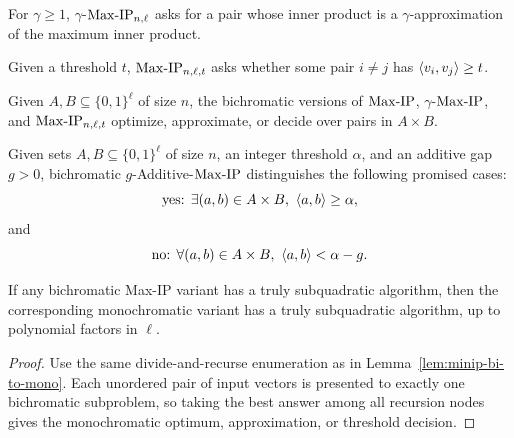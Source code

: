 \begin{definition}
  \label{def:gamma-max-ip}
  For $\gamma\geq 1$, $\gamma$-$\mathrm{Max\mbox{-}IP}_{n,\ell}$ asks for a pair whose inner
  product is a $\gamma$-approximation of the maximum inner product.
\end{definition}

\begin{definition}
  \label{def:max-ip-decision}
  Given a threshold $t$, $\mathrm{Max\mbox{-}IP}_{n,\ell,t}$ asks whether some pair $i\neq j$
  has $\left\langle v_i,v_j\right\rangle\geq t$.
\end{definition}

\begin{definition}
  \label{def:bichromatic-max-ip}
  Given $A,B\subseteq\{0,1\}^{\ell}$ of size $n$, the bichromatic versions of
  $\mathrm{Max\mbox{-}IP}$, $\gamma$-$\mathrm{Max\mbox{-}IP}$, and $\mathrm{Max\mbox{-}IP}_{n,\ell,t}$ optimize, approximate, or
  decide over pairs in $A\times B$.
\end{definition}

\begin{definition}
  \label{def:additive-bichromatic-max-ip}
  Given sets $A,B\subseteq\{0,1\}^{\ell}$ of size $n$, an integer threshold
  $\alpha$, and an additive gap $g>0$, bichromatic $g$-Additive-$\mathrm{Max\mbox{-}IP}$
  distinguishes the following promised cases:
  \[
    \text{yes: }\exists (a,b)\in A\times B,\ \left\langle a,b\right\rangle\geq\alpha,
  \]
  and
  \[
    \text{no: }\forall (a,b)\in A\times B,\ \ip{a}{b}<\alpha-g.
  \]
\end{definition}

\begin{lemma}
  \label{lem:maxip-bi-to-mono}
  If any bichromatic Max-IP variant has a truly subquadratic algorithm, then the
  corresponding monochromatic variant has a truly subquadratic algorithm, up to
  polynomial factors in $\ell$.
\end{lemma}
\begin{proof}
  Use the same divide-and-recurse enumeration as in
  Lemma~\ref{lem:minip-bi-to-mono}.  Each unordered pair of input vectors is
  presented to exactly one bichromatic subproblem, so taking the best answer
  among all recursion nodes gives the monochromatic optimum, approximation, or
  threshold decision.
\end{proof}

